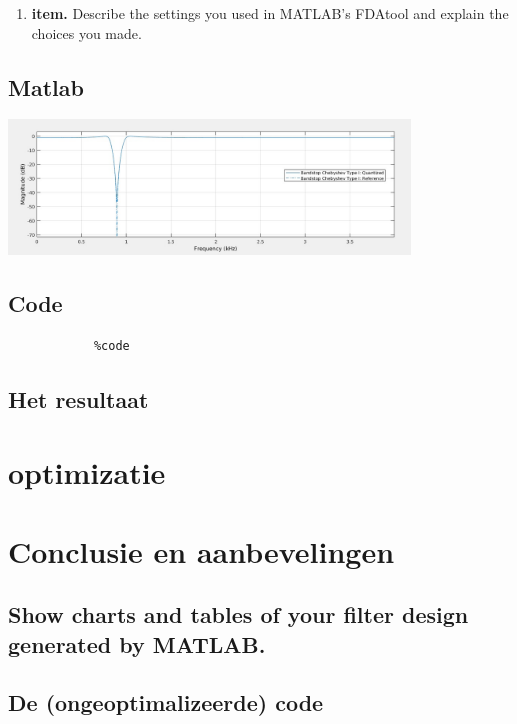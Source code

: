 \documentclass[11pt,a4paper]{article}
\newcommand\litem[1]{\item{\bfseries#1.\space}}
\begin{document}
		\begin{enumerate}[label=\emph{\alph*)}]
			\litem{item} Describe the settings you 					used in MATLAB’s FDAtool and explain the 					choices you made.
		\end{enumerate}
	
		\subsection{Matlab}
	
		\includegraphics[width=0.80\textwidth]{iirMatlab}\par\vspace{1cm}		
		
		\subsection{Code}

		\begin{lstlisting}
			%code
		\end{lstlisting}
		
		\subsection{Het resultaat}	
	
	\section{optimizatie}
	

	\section{Conclusie en aanbevelingen}	

	\subsection{Show charts and tables of your filter design generated by MATLAB.}
	\clearpage
	
	\subsection{De (ongeoptimalizeerde) code}
\end{document}
